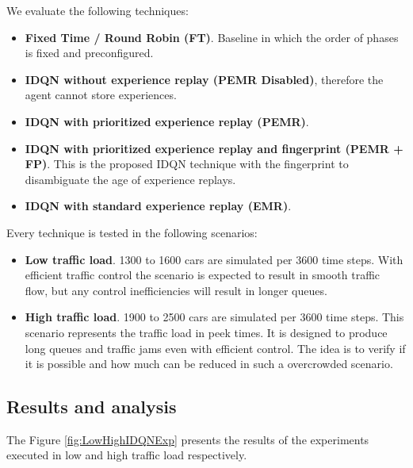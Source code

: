 \documentclass{llncs}
\begin{document}
We evaluate the following techniques:

\begin{itemize}
\item \textbf{Fixed Time / Round Robin (FT)}. Baseline in which the order of phases is fixed and preconfigured.

\item \textbf{IDQN without experience replay (PEMR Disabled)}, therefore the agent cannot store experiences.

\item \textbf{IDQN with prioritized experience replay (PEMR)}. 

\item \textbf{IDQN with prioritized experience replay and fingerprint (PEMR + FP)}. This is the proposed IDQN technique with the fingerprint to disambiguate the age of experience replays.

\item \textbf{IDQN with standard experience replay (EMR)}.
\end{itemize}

Every technique is tested in the following scenarios:

\begin{itemize}
\item \textbf{Low traffic load}. 1300 to 1600 cars are simulated per 3600 time steps. With efficient traffic control the scenario is expected to result in smooth traffic flow, but any control inefficiencies will result in longer queues. 
\item \textbf{High traffic load}. 1900 to 2500 cars are simulated per 3600 time steps.  This scenario represents the traffic load in peek times. It is designed to produce long queues and traffic jams even with efficient control. The idea is to verify if it is possible and how much can be reduced in such a overcrowded scenario. 
\end{itemize}

\subsection{Results and analysis}

The Figure \ref{fig:LowHighIDQNExp} presents the results of the experiments executed in low and high traffic load respectively.
\end{document}

